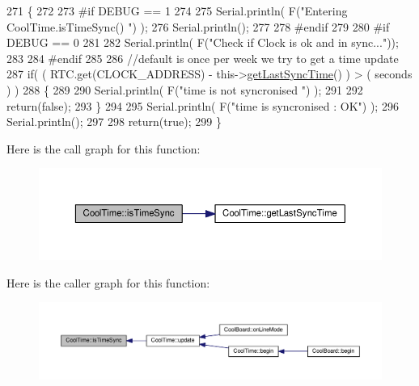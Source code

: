 \begin{DoxyCode}
271 \{
272 
273 \textcolor{preprocessor}{#if DEBUG == 1}
274 
275     Serial.println( F(\textcolor{stringliteral}{"Entering CoolTime.isTimeSync() "}) );
276     Serial.println();
277 
278 \textcolor{preprocessor}{#endif }
279 
280 \textcolor{preprocessor}{#if DEBUG == 0}
281 
282     Serial.println( F(\textcolor{stringliteral}{"Check if Clock is ok and in sync..."}));
283 
284 \textcolor{preprocessor}{#endif}
285 
286     \textcolor{comment}{//default is once per week we try to get a time update}
287     \textcolor{keywordflow}{if}( ( RTC.get(CLOCK\_ADDRESS) - this->\hyperlink{class_cool_time_a5d17f707a9d337720493b2bce9d41c21}{getLastSyncTime}() ) > ( seconds ) ) 
288     \{
289 
290         Serial.println( F(\textcolor{stringliteral}{"time is not syncronised "}) );
291     
292         \textcolor{keywordflow}{return}(\textcolor{keyword}{false});  
293     \}
294     
295     Serial.println( F(\textcolor{stringliteral}{"time is syncronised : OK"}) );
296     Serial.println();
297 
298     \textcolor{keywordflow}{return}(\textcolor{keyword}{true});
299 \}
\end{DoxyCode}
Here is the call graph for this function\+:\nopagebreak
\begin{figure}[H]
\begin{center}
\leavevmode
\includegraphics[width=350pt]{d6/d49/class_cool_time_a5ae038a4498602b189f76a10bf02adf8_cgraph}
\end{center}
\end{figure}
Here is the caller graph for this function\+:\nopagebreak
\begin{figure}[H]
\begin{center}
\leavevmode
\includegraphics[width=350pt]{d6/d49/class_cool_time_a5ae038a4498602b189f76a10bf02adf8_icgraph}
\end{center}
\end{figure}
\mbox{\label{class_cool_time_af355e7f9b3898211cd2ff25eab5933b1}} 
